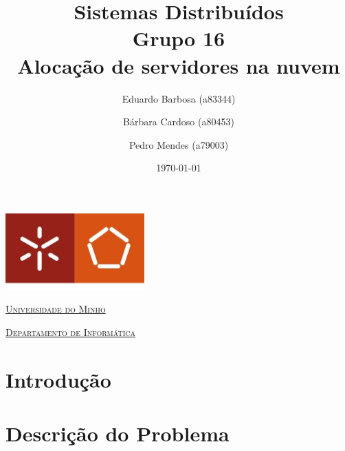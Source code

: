 \documentclass[a4paper]{article}
\begin{document}
\title{Sistemas Distribuídos\\ Grupo 16 \\ Alocação de servidores na nuvem}
\author{Eduardo Barbosa (a83344) \and Bárbara Cardoso (a80453) \and Pedro Mendes (a79003)}
\date{\today}

\begin{titlepage}

    \thispagestyle{empty}
    \begin{center}
        \begin{minipage}{0.75\linewidth}
            \centering
            \includegraphics[width=0.4\textwidth]{eng.jpeg}\par\vspace{1cm}
            \vspace{1.5cm}
            \href{https://www.uminho.pt/PT}{\scshape\LARGE Universidade do Minho} \par
            \vspace{1cm}
            \href{https://www.di.uminho.pt/}{\scshape\Large Departamento de Informática} \par
            \vspace{1.5cm}

            \maketitle
        \end{minipage}
    \end{center}

\end{titlepage}

\tableofcontents

\pagebreak

\section{Introdução}

\pagebreak
\section{Descrição do Problema}
\end{document}
